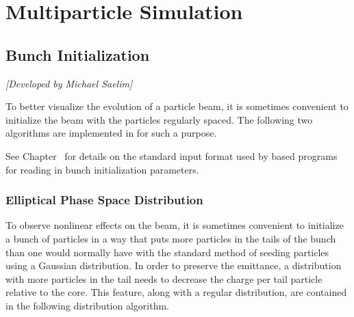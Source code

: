 \chapter{Multiparticle Simulation}

\section{Bunch Initialization}
\label{s:bunch.init}

\textit{[Developed by Michael Saelim]}

To better visualize the evolution of a particle beam, it is sometimes convenient to initialize the
beam with the particles regularly spaced. The following two algorithms are implemented in \bmad for
such a purpose.

See Chapter~ for details on the standard input format used by \bmad based programs for
reading in bunch initialization parameters.

\subsection{Elliptical Phase Space Distribution}
\label{s:ellipse.init}

To observe nonlinear effects on the beam, it is sometimes convenient to
initialize a bunch of particles in a way that puts more particles in the
tails of the bunch than one would normally have with the standard method
of seeding particles using a Gaussian distribution. In order to preserve
the emittance, a distribution with more particles in the tail needs to
decrease the charge per tail particle relative to the core. 
This feature, along with a regular distribution,
are contained in the following 
distribution algorithm. 

